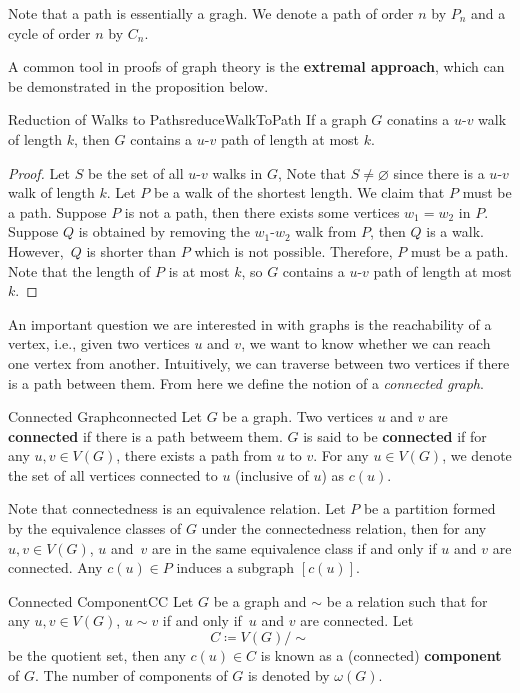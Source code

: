 \documentclass[math]{amznotes}
\theoremstyle{remark}
\newcommand{\0}{\mathbf{0}}
\newcommand{\1}{\mathbf{1}}
\begin{document}
Note that a path is essentially a gragh. We denote a path of order $n$ by $P_n$ and a cycle of order $n$ by $C_n$.

A common tool in proofs of graph theory is the \textbf{extremal approach}, which can be demonstrated in the proposition below.
\begin{probox}{Reduction of Walks to Paths}{reduceWalkToPath}
    If a graph $G$ conatins a $u$-$v$ walk of length $k$, then $G$ contains a $u$-$v$ path of length at most $k$.
    \tcblower
    \begin{proof}
        Let $S$ be the set of all $u$-$v$ walks in $G$, Note that $S \neq \varnothing$ since there is a $u$-$v$ walk of length $k$. Let $P$ be a walk of the shortest length. We claim that $P$ must be a path. Suppose $P$ is not a path, then there exists some vertices $w_1 = w_2$ in $P$. Suppose $Q$ is obtained by removing the $w_1$-$w_2$ walk from $P$, then $Q$ is a walk. However,~$Q$ is shorter than $P$ which is not possible. Therefore, $P$ must be a path. Note that the length of $P$ is at most $k$, so $G$ contains a $u$-$v$ path of length at most $k$.
    \end{proof}
\end{probox}
An important question we are interested in with graphs is the reachability of a vertex, i.e., given two vertices $u$ and $v$, we want to know whether we can reach one vertex from another. Intuitively, we can traverse between two vertices if there is a path between them. From here we define the notion of a \textit{connected graph}.
\begin{dfnbox}{Connected Graph}{connected}
    Let $G$ be a graph. Two vertices $u$ and $v$ are {\color{red} \textbf{connected}} if there is a path betweem them. $G$ is said to be {\color{red} \textbf{connected}} if for any $u, v \in V(G)$, there exists a path from $u$ to $v$. For any $u \in V(G)$, we denote the set of all vertices connected to $u$ (inclusive of $u$) as $c(u)$.
\end{dfnbox}
Note that connectedness is an equivalence relation. Let $P$ be a partition formed by the equivalence classes of $G$ under the connectedness relation, then for any $u, v \in V(G)$, $u$ and~$v$ are in the same equivalence class if and only if $u$ and $v$ are connected. Any $c(u) \in P$ induces a subgraph $[c(u)]$.
\begin{dfnbox}{Connected Component}{CC}
    Let $G$ be a graph and $\sim$ be a relation such that for any $u, v \in V(G)$, $u\sim v$ if and only if~$u$ and $v$ are connected. Let
    \begin{equation*}
        C \coloneqq V(G) \slash \sim
    \end{equation*}
    be the quotient set, then any $c(u) \in C$ is known as a (connected) {\color{red} \textbf{component}} of $G$. The number of components of $G$ is denoted by $\omega(G)$.
\end{dfnbox}
\end{document}
